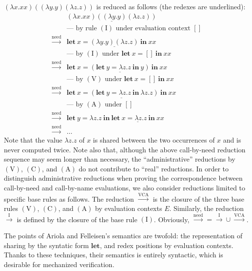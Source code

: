\documentclass{llncs}
\newcommand{\LET}[3]{\mathbf{let}~#1=#2~\mathbf{in}~#3}
\newcommand{\CALLBYNEED}{\xrightarrow{\mathrm{need}}}
\newcommand{\CALLBYNEEDI}{\xrightarrow{\mathrm{I}}}
\newcommand{\CALLBYNEEDVCA}{\xrightarrow{\mathrm{VCA}}}
\begin{document}
$(\lambda x.xx)((\lambda y.y)(\lambda z.z))$
is reduced as follows (the redexes are underlined):
\[ \begin{array}{ll}
	& \underline{(\lambda x.xx)((\lambda y.y)(\lambda z.z))} \\
	& \mbox{--- by rule $(\mbox{I})$ under evaluation context $[]$} \\
	\CALLBYNEED & \LET{x}{\underline{(\lambda y.y)(\lambda z.z)}}{xx}\\
	& \mbox{--- by $(\mbox{I})$ under $\LET{x}{[]}{xx}$} \\
	\CALLBYNEED & \LET{x}{\underline{(\LET{y}{\lambda z.z}{y})}}{xx} \\
	& \mbox{--- by $(\mbox{V})$ under $\LET{x}{[]}{xx}$} \\
	\CALLBYNEED & \underline{\LET{x}{(\LET{y}{\lambda z.z}{\lambda z.z})}{xx}} \\
	& \mbox{--- by $(\mbox{A})$ under $[]$} \\
	\CALLBYNEED & \LET{y}{\lambda z.z}{\underline{\LET{x}{\lambda z.z}{xx}}} \\
	\CALLBYNEED & \dots
\end{array} \]
Note that the value $\lambda z.z$ of $x$ is shared between the two occurrences of $x$ and is never computed twice.  Note also that, although the above call-by-need reduction sequence may seem longer than necessary, the ``administrative'' reductions by $(\mbox{V})$, $(\mbox{C})$, and $(\mbox{A})$ do not contribute to ``real'' reductions.
%
In order to distinguish administrative reductions when proving the correspondence between call-by-need and call-by-name evaluations,
we also consider reductions limited to specific base rules as follows.
The reduction $\CALLBYNEEDVCA$ is the closure of the three base rules $(\mbox{V})$, $(\mbox{C})$, and $(\mbox{A})$ by evaluation contexts $E$.
Similarly, the reduction $\CALLBYNEEDI$ is defined by the closure of the base rule $(\mbox{I})$.
Obviously, ${\CALLBYNEED} = {\CALLBYNEEDI}\cup{\CALLBYNEEDVCA}$.

The points of Ariola and Felleisen's semantics are twofold:
the representation of sharing by the syntatic form $\mathbf{let}$,
and redex positions by evaluation contexts.
Thanks to these techniques, their semantics is entirely syntactic,
which is desirable for mechanized verification.
\end{document}
